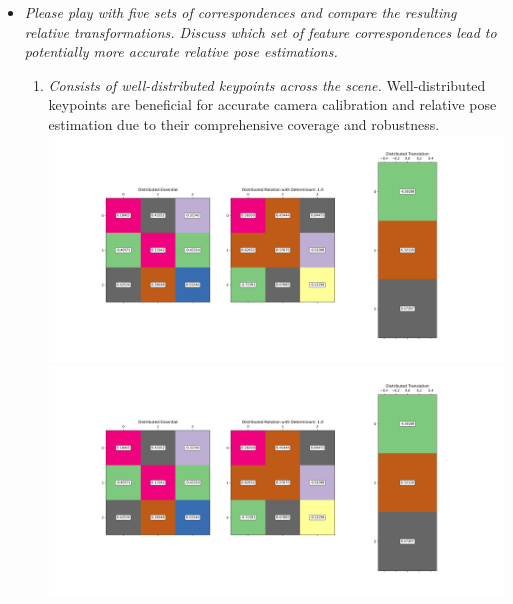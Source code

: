 \documentclass[11pt]{article}
\begin{document}
\begin{itemize}
        \item \textit{Please play with five sets of correspondences and compare the resulting relative
        transformations. Discuss which set of feature correspondences lead to potentially more accurate relative pose
        estimations.}\newline
        \begin{enumerate}
            \item \textit{Consists of well-distributed keypoints across the scene.}\newline
            Well-distributed keypoints are beneficial for accurate camera calibration and relative pose
            estimation due to their comprehensive coverage and robustness.\newline
            \includegraphics[width=\textwidth]{Output Pictures/Distributed Lines}\newline
            \includegraphics[width=\textwidth]{Output Pictures/Distributed Matrices}\newline


\end{enumerate}
\end{itemize}
\end{document}
